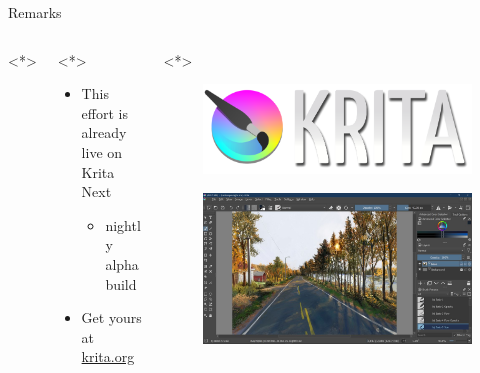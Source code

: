 \documentclass[final, aspectratio=169]{divoc}
\begin{document}
\begin{frame}{Remarks}
  \begin{columns}<*>
    \begin{column}{.70\textwidth}<*>
      \begin{itemize}[<*>]
        \item This effort is already live on Krita Next
              \begin{itemize}
                \item \textnormal{\color{red} nightly alpha build }
              \end{itemize}
        \item Get yours at \href{https://krita.org/en}{krita.org}
      \end{itemize}
    \end{column}
    \begin{column}{.30\textwidth}<*>
      \begin{figure}
        \includegraphics[width=\columnwidth,keepaspectratio]{figures/krita_logo.png}
      \end{figure}
      \begin{figure}
        \includegraphics[width=\columnwidth,keepaspectratio]{figures/raghukamath.jpg}
      \end{figure}
    \end{column}
  \end{columns}
\end{frame}
\end{document}
